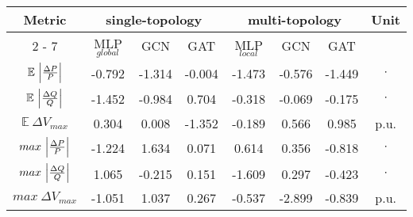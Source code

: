 \makegapedcells\begin{tabular}{|c||c|c|c||c|c|c||c|}%
                   \hline%
                   \multirow{2}{*}{Metric} & \multicolumn{3}{c||}{single{-}topology} & \multicolumn{3}{c||}{multi{-}topology}& \multirow{2}{*}{Unit}\\%
                   \cline{2%
                   -%
                   7}%
                   & MLP$_{global}$ & GCN      & GAT      & MLP$_{local}$ & GCN      & GAT      &         \\%
                   \hline%
                   $\mathbb{E} \ \Bigl|\frac{\Delta P}{P}\Bigr|$ & {-}0.792       & {-}1.314 & {-}0.004 & {-}1.473& {-}0.576& {-}1.449& $\cdot$\\%
                   \hline%
                   $\mathbb{E} \ \Bigl|\frac{\Delta Q}{Q}\Bigr|$ & {-}1.452       & {-}0.984 & 0.704    & {-}0.318      & {-}0.069& {-}0.175& $\cdot$\\%
                   \hline%
                   $\mathbb{E} \ \Delta V_{max}$                 & 0.304          & 0.008    & {-}1.352 & {-}0.189      & 0.566    & 0.985    & p.u.    \\%
                   \hline%
                   $max \ \Bigl|\frac{\Delta P}{P}\Bigr|$        & {-}1.224       & 1.634    & 0.071    & 0.614         & 0.356    & {-}0.818& $\cdot$\\%
                   \hline%
                   $max \ \Bigl|\frac{\Delta Q}{Q}\Bigr|$        & 1.065          & {-}0.215 & 0.151    & {-}1.609      & 0.297    & {-}0.423& $\cdot$\\%
                   \hline%
                   $max \ \Delta V_{max}$                        & {-}1.051       & 1.037    & 0.267    & {-}0.537      & {-}2.899 & {-}0.839 & p.u.    \\%
                   \hline%
\end{tabular}